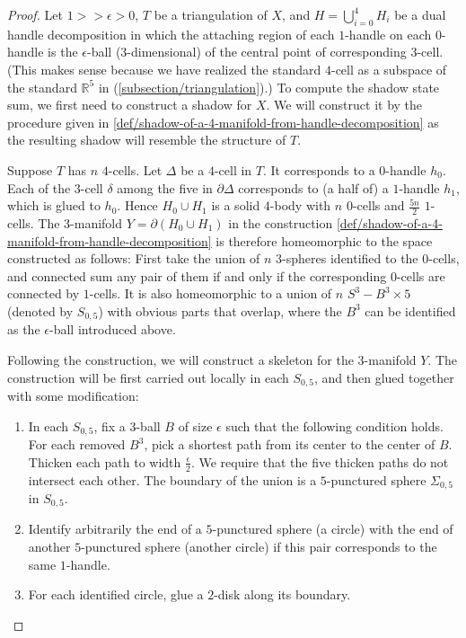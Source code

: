 \begin{proof}
  Let $1 >> \epsilon > 0$, $T$ be a triangulation of $X$, and
  $H = \bigcup_{i=0}^{4} H_{i}$ be a dual handle decomposition in
  which the attaching region of each $1$-handle on each
  $0$-handle is the $\epsilon$-ball ($3$-dimensional) of the
  central point of corresponding $3$-cell. (This makes sense
  because we have realized the standard $4$-cell as a subspace of
  the standard $\mathbb{R}^{5}$ in
  (\ref{subsection/triangulation}).) To compute the shadow state
  sum, we first need to construct a shadow for $X$. We will
  construct it by the procedure given in
  \ref{def/shadow-of-a-4-manifold-from-handle-decomposition} as
  the resulting shadow will resemble the structure of $T$.

  Suppose $T$ has $n$ $4$-cells. Let $\Delta$ be a $4$-cell in
  $T$. It corresponds to a $0$-handle $h_{0}$. Each of the
  $3$-cell $\delta$ among the five in $\partial \Delta$
  corresponds to (a half of) a $1$-handle $h_{1}$, which is glued
  to $h_{0}$. Hence $H_{0} \cup H_{1}$ is a solid $4$-body with
  $n$ $0$-cells and $\frac{5n}{2}$ $1$-cells. The $3$-manifold
  $Y = \partial(H_{0} \cup H_{1})$ in the
  construction \ref{def/shadow-of-a-4-manifold-from-handle-decomposition}
  is therefore homeomorphic to the space constructed as follows:
  First take the union of $n$ $3$-spheres identified to the
  $0$-cells, and connected sum any pair of them if and only if
  the corresponding $0$-cells are connected by $1$-cells. It is
  also homeomorphic to a union of $n$ $S^{3} - B^{3} \times 5$
  (denoted by $S_{0,5}$) with obvious parts that overlap, where
  the $B^{3}$ can be identified as the $\epsilon$-ball introduced
  above.

  Following the construction, we will construct a skeleton for
  the $3$-manifold $Y$. The construction will be first carried
  out locally in each $S_{0,5}$, and then glued together with
  some modification:

  \begin{enumerate}
    \item In each $S_{0,5}$, fix a $3$-ball $B$ of size
          $\epsilon$ such that the following condition holds. For
          each removed $B^{3}$, pick a shortest path from its
          center to the center of $B$. Thicken each path to width
          $\frac{\epsilon}{2}$. We require that the five thicken
          paths do not intersect each other. The boundary of the
          union is a $5$-punctured sphere $\Sigma_{0,5}$ in
          $S_{0,5}$.
    \item Identify arbitrarily the end of a $5$-punctured sphere
          (a circle) with the end of another $5$-punctured sphere
          (another circle) if this pair corresponds to the same
          $1$-handle.
    \item For each identified circle, glue a $2$-disk along its
          boundary.
  \end{enumerate}


\end{proof}
